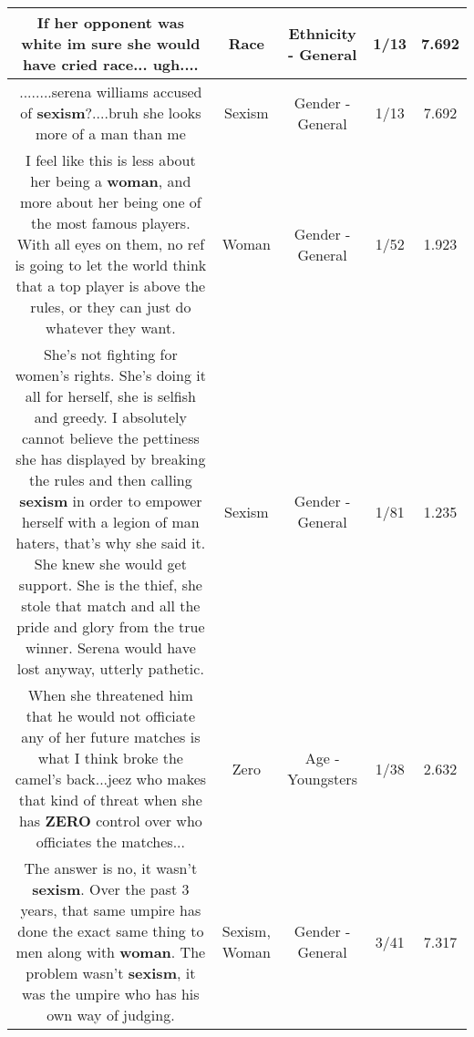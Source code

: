 \documentclass[11pt]{article}
\newlength\mylength
\begin{document}
\begin{center}
\begin{longtable}{|C{.65\mylength}|C{.30\mylength}|C{.12\mylength}|C{.12\mylength}|C{.12\mylength}|}
  \small If her opponent was white im sure she would have cried \textbf{race}... ugh....\normalsize   & Race & Ethnicity - General & 1/13 & 7.692 \\  \hline
  \small ........serena williams accused of \textbf{sexism}?....bruh she looks more of a man than me\normalsize   & Sexism & Gender - General & 1/13 & 7.692 \\  \hline
  \small I feel like this is less about her being a \textbf{woman}, and more about her being one of the most famous players. With all eyes on them, no ref is going to let the world think that a top player is above the rules, or they can just do whatever they want.\normalsize   & Woman & Gender - General & 1/52 & 1.923 \\  \hline
  \small She's not fighting for women's rights. She's doing it all for herself, she is selfish and greedy. I absolutely cannot believe the pettiness she has displayed by breaking the rules and then calling \textbf{sexism} in order to empower herself with a legion of man haters, that's why she said it. She knew she would get support. She is the thief, she stole that match and all the pride and glory from the true winner. Serena would have lost anyway, utterly pathetic.\normalsize   & Sexism & Gender - General & 1/81 & 1.235 \\  \hline
  \small When she threatened him that he would not officiate any of her future matches is what I think broke the camel's back...jeez who makes that kind of threat when she has \textbf{ZERO} control over who officiates the matches...\normalsize   & Zero & Age - Youngsters & 1/38 & 2.632 \\  \hline
  \small The answer is no, it wasn't \textbf{sexism}. Over the past 3 years, that same umpire has done the exact same thing to men along with \textbf{woman}. The problem wasn't \textbf{sexism}, it was the umpire who has his own way of judging.\normalsize   & Sexism, Woman & Gender - General & 3/41 & 7.317 \\  \hline

\end{longtable}
\end{center}
\end{document}

